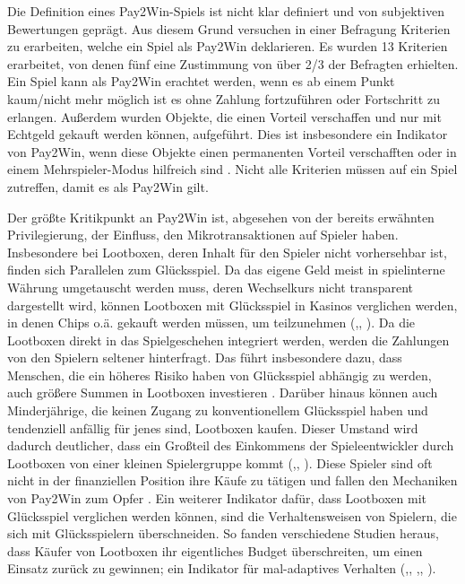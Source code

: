 Die Definition eines Pay2Win-Spiels ist nicht klar definiert und von subjektiven Bewertungen geprägt. Aus diesem Grund versuchen \cite{Tregel2020} in einer Befragung Kriterien zu erarbeiten, welche ein Spiel als Pay2Win deklarieren. Es wurden 13 Kriterien erarbeitet, von denen fünf eine Zustimmung von über 2/3 der Befragten erhielten. Ein Spiel kann als Pay2Win erachtet werden, wenn es ab einem Punkt kaum/nicht mehr möglich ist es ohne Zahlung fortzuführen oder Fortschritt zu erlangen. Außerdem wurden Objekte, die einen Vorteil verschaffen und nur mit Echtgeld gekauft werden können, aufgeführt. Dies ist insbesondere ein Indikator von Pay2Win, wenn diese Objekte einen permanenten Vorteil verschafften oder in einem Mehrspieler-Modus hilfreich sind \citep[S. 179]{Tregel2020}. Nicht alle Kriterien müssen auf ein Spiel zutreffen, damit es als Pay2Win gilt.

Der größte Kritikpunkt an Pay2Win ist, abgesehen von der bereits erwähnten Privilegierung, der Einfluss, den Mikrotransaktionen auf Spieler haben. Insbesondere bei Lootboxen, deren Inhalt für den Spieler nicht vorhersehbar ist, finden sich Parallelen zum Glücksspiel. Da das eigene Geld meist in spielinterne Währung umgetauscht werden muss, deren Wechselkurs nicht transparent dargestellt wird, können Lootboxen mit Glücksspiel in Kasinos verglichen werden, in denen Chips o.ä. gekauft werden müssen, um teilzunehmen (\cite[S. 7 ff.]{Drummond2018},, \cite[S. 185 ff.]{Nielsen2019}). Da die Lootboxen direkt in das Spielgeschehen integriert werden, werden die Zahlungen von den Spielern seltener hinterfragt. Das führt insbesondere dazu, dass Menschen, die ein höheres Risiko haben von Glücksspiel abhängig zu werden, auch größere Summen in Lootboxen investieren \citep[S. 5 f.]{Zendle2018}. Darüber hinaus können auch Minderjährige, die keinen Zugang zu konventionellem Glücksspiel haben und tendenziell anfällig für jenes sind, Lootboxen kaufen. Dieser Umstand wird dadurch deutlicher, dass ein Großteil des Einkommens der Spieleentwickler durch Lootboxen von einer kleinen Spielergruppe kommt (\cite[S. 8 f.]{Zendle2020},, \cite{Takahashi2014}). Diese Spieler sind oft nicht in der finanziellen Position ihre Käufe zu tätigen und fallen den Mechaniken von Pay2Win zum Opfer \citep{Close2021}. Ein weiterer Indikator dafür, dass Lootboxen mit Glücksspiel verglichen werden können, sind die Verhaltensweisen von Spielern, die sich mit Glücksspielern überschneiden. So fanden verschiedene Studien heraus, dass Käufer von Lootboxen ihr eigentliches Budget überschreiten, um einen Einsatz zurück zu gewinnen; ein Indikator für mal-adaptives Verhalten (\cite[S. 9 ff.]{Nielsen2019},, \cite[S. 1968 f.]{King2018a},, \cite[S. 4 f.]{Xiao2021}).

